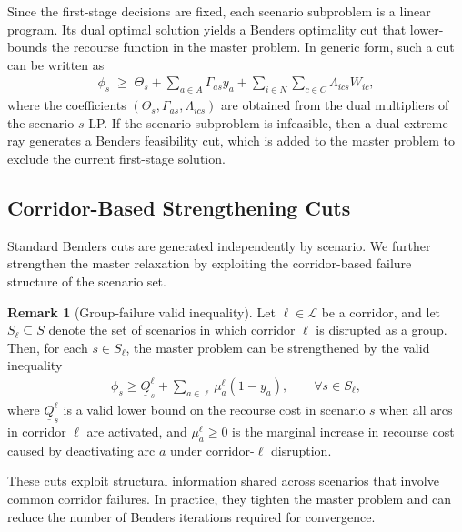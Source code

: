 \documentclass[final,3p,authoryear]{elsarticle}
\theoremstyle{definition}
\newtheorem{remark}{Remark}
\begin{document}
Since the first-stage decisions are fixed, each scenario subproblem is a
linear program. Its dual optimal solution yields a Benders optimality
cut that lower-bounds the recourse function in the master problem. In
generic form, such a cut can be written as
\begin{align}
\phi_s
\;\ge\;
\Theta_s
+ \sum_{a \in A} \Gamma_{as} y_a
+ \sum_{i \in N}\sum_{c \in C} \Lambda_{ics} W_{ic},
\label{eq:benders-opt-cut-generic}
\end{align}
where the coefficients
$(\Theta_s,\Gamma_{as},\Lambda_{ics})$ are obtained from the dual
multipliers of the scenario-$s$ LP. If the scenario subproblem is
infeasible, then a dual extreme ray generates a Benders feasibility cut,
which is added to the master problem to exclude the current first-stage
solution.

\subsection{Corridor-Based Strengthening Cuts}
\label{sec:valid-ineq}

Standard Benders cuts are generated independently by scenario. We
further strengthen the master relaxation by exploiting the
corridor-based failure structure of the scenario set.

\begin{remark}[Group-failure valid inequality]
\label{prop:group-cut}
Let $\ell \in \mathcal L$ be a corridor, and let
$S_\ell \subseteq S$ denote the set of scenarios in which corridor
$\ell$ is disrupted as a group. Then, for each $s \in S_\ell$, the
master problem can be strengthened by the valid inequality
\begin{align}
\phi_s \ge \underline Q_s^\ell
+ \sum_{a \in \ell} \mu_a^\ell (1-y_a),
\qquad \forall s \in S_\ell,
\label{eq:group-cut}
\end{align}
where $\underline Q_s^\ell$ is a valid lower bound on the recourse cost
in scenario $s$ when all arcs in corridor $\ell$ are activated, and
$\mu_a^\ell \ge 0$ is the marginal increase in recourse cost caused by
deactivating arc $a$ under corridor-$\ell$ disruption.
\end{remark}

These cuts exploit structural information shared across scenarios that
involve common corridor failures. In practice, they tighten the master
problem and can reduce the number of Benders iterations required for
convergence.
\end{document}
